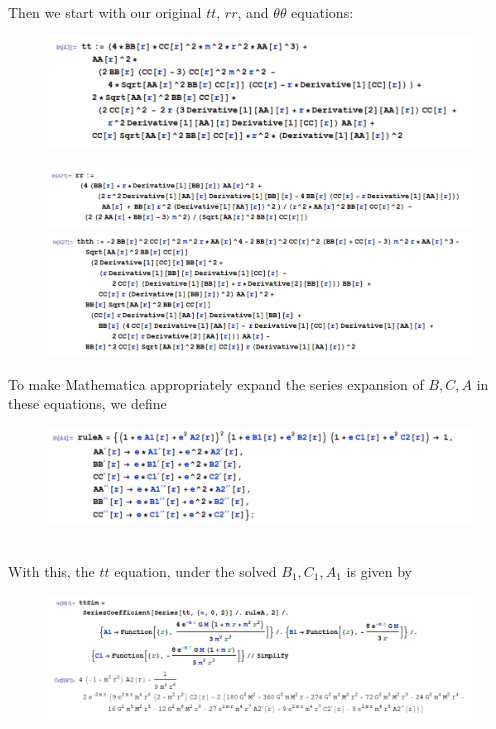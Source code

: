 \documentclass{book}
\theoremstyle{definition}
\begin{document}
Then we start with our original $tt$, $rr$, and $\theta\theta$ equations:
\begin{figure}[!htb]
	\centering
	\includegraphics[scale=0.25]{tt2}
\end{figure}


\begin{figure}[!htb]
	\centering
	\includegraphics[scale=0.25]{rr2}
	\includegraphics[scale=0.25]{thth2}
\end{figure}

To make Mathematica appropriately expand the series expansion of $B,C,A$ in these equations, we define 
\begin{figure}[!htb]
	\centering
	\includegraphics[scale=0.3]{ruleA}
\end{figure}\\



With this, the $tt$ equation, under the solved $B_1, C_1, A_1$ is given by
\begin{figure}[!htb]
	\centering
	\includegraphics[scale=0.2]{tt2Sim}
\end{figure}\\
\end{document}
